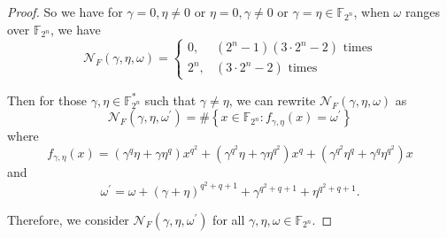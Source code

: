 \documentclass[12 pt]{article}
\def\F{{\mathbb F}}
\begin{document}
{\begin{proof}
  So we have for $ \gamma=0,\eta\ne 0 $ or $ \eta=0,\gamma\ne 0 $ or $ \gamma=\eta\in\F_{2^n} $, when $ \omega $ ranges over 
  $ \F_{2^n} $, we have 
  \begin{equation}\label{eq:N_F_trivil} 
    \mathcal{N}_F(\gamma,\eta,\omega)=\begin{cases}
      0,&(2^n-1)(3\cdot 2^{n}-2)\text{~times}\\
      2^n,&(3\cdot 2^{n}-2) \text{~times}
    \end{cases}
  \end{equation}

  Then for those $ \gamma,\eta\in\F_{2^n}^* $ such that $ \gamma\ne\eta $, 
   we can rewrite $ \mathcal{N}_F(\gamma,\eta,\omega) $ as 
  \[\mathcal{N}_F(\gamma,\eta,\omega^{\prime})=\#\left\{ x\in\F_{2^n}:f_{\gamma,\eta}(x)=\omega^{\prime} \right\}\]
  where 
  \begin{equation}\label{eq:linearized_f}
	f_{\gamma,\eta}(x) =\left( \gamma^q\eta+\gamma\eta^q \right)x^{q^2}+\left( \gamma^{q^2}\eta+\gamma\eta^{q^2} \right)x^q+\left( \gamma^{q^2}\eta^q+\gamma^q\eta^{q^2} \right)x
\end{equation}
  and 
  \[ \omega^{\prime}=\omega+(\gamma+\eta)^{q^2+q+1}+\gamma^{q^2+q+1}+\eta^{q^2+q+1}. \]

  Therefore, we consider $ \mathcal{N}_F(\gamma,\eta,\omega^{\prime}) $ for all $ \gamma,\eta,\omega\in\F_{2^n} $.




\end{proof}}
\end{document}
